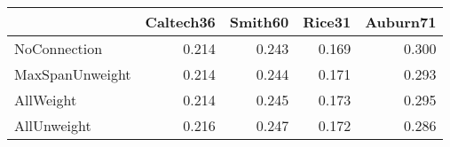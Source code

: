 \begin{tabular}{lrrrr}
\toprule
{} & Caltech36 & Smith60 & Rice31 & Auburn71 \\
\midrule
NoConnection    &     0.214 &   0.243 &  0.169 &    0.300 \\
MaxSpanUnweight &     0.214 &   0.244 &  0.171 &    0.293 \\
AllWeight       &     0.214 &   0.245 &  0.173 &    0.295 \\
AllUnweight     &     0.216 &   0.247 &  0.172 &    0.286 \\
\bottomrule
\end{tabular}
